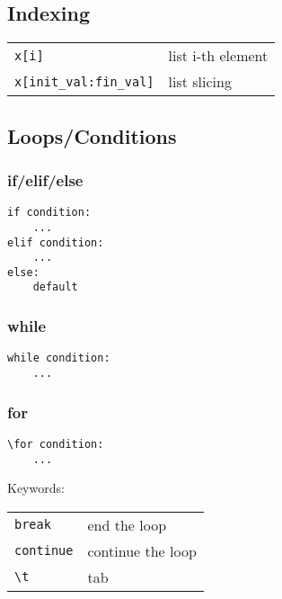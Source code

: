         
    \subsection{Indexing}
        \begin{tabular}{@{}ll@{}}
            \verb!x[i]!    & list i-th element \\
            \verb!x[init_val:fin_val]!    & list slicing \\
        \end{tabular}







\subsection{Loops/Conditions}

\subsubsection{if/elif/else}

\begin{verbatim}
if condition:
    ...
elif condition:
    ...
else:
    default
\end{verbatim}


\subsubsection{while}

\begin{verbatim}
while condition:
    ...
\end{verbatim}


\subsubsection{for}

\begin{verbatim}
\for condition:
    ...
\end{verbatim}


Keywords:
\begin{tabular}{@{}ll@{}}
    \verb!break!    & end the loop \\
    \verb!continue!    & continue the loop \\
    \verb!\t!    & tab \\
\end{tabular}


